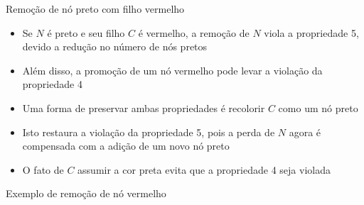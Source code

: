 \begin{frame}[fragile]{Remoção de nó preto com filho vermelho}

    \begin{itemize}
        \item Se $N$ é preto e seu filho $C$ é vermelho, a remoção de $N$ viola a propriedade 5,
            devido a redução no número de nós pretos

        \item Além disso, a promoção de um nó vermelho pode levar a violação da propriedade 4

        \item Uma forma de preservar ambas propriedades é recolorir $C$ como um nó preto

        \item Isto restaura a violação da propriedade 5, pois a perda de $N$ agora é compensada
            com a adição de um novo nó preto

        \item O fato de $C$ assumir a cor preta evita que a propriedade 4 seja violada
    \end{itemize}

\end{frame}

\begin{frame}[fragile]{Exemplo de remoção de nó vermelho}


\end{frame}

